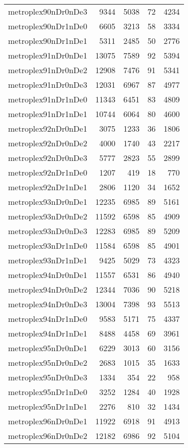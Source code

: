 \begin{longtable}{lrrrr}
metroplex90nDr0nDe3 & 9344 & 5038 & 72 & 4234 \\
metroplex90nDr1nDe0 & 6605 & 3213 & 58 & 3334 \\
metroplex90nDr1nDe1 & 5311 & 2485 & 50 & 2776 \\
metroplex91nDr0nDe1 & 13075 & 7589 & 92 & 5394 \\
metroplex91nDr0nDe2 & 12908 & 7476 & 91 & 5341 \\
metroplex91nDr0nDe3 & 12031 & 6967 & 87 & 4977 \\
metroplex91nDr1nDe0 & 11343 & 6451 & 83 & 4809 \\
metroplex91nDr1nDe1 & 10744 & 6064 & 80 & 4600 \\
metroplex92nDr0nDe1 & 3075 & 1233 & 36 & 1806 \\
metroplex92nDr0nDe2 & 4000 & 1740 & 43 & 2217 \\
metroplex92nDr0nDe3 & 5777 & 2823 & 55 & 2899 \\
metroplex92nDr1nDe0 & 1207 & 419 & 18 & 770 \\
metroplex92nDr1nDe1 & 2806 & 1120 & 34 & 1652 \\
metroplex93nDr0nDe1 & 12235 & 6985 & 89 & 5161 \\
metroplex93nDr0nDe2 & 11592 & 6598 & 85 & 4909 \\
metroplex93nDr0nDe3 & 12283 & 6985 & 89 & 5209 \\
metroplex93nDr1nDe0 & 11584 & 6598 & 85 & 4901 \\
metroplex93nDr1nDe1 & 9425 & 5029 & 73 & 4323 \\
metroplex94nDr0nDe1 & 11557 & 6531 & 86 & 4940 \\
metroplex94nDr0nDe2 & 12344 & 7036 & 90 & 5218 \\
metroplex94nDr0nDe3 & 13004 & 7398 & 93 & 5513 \\
metroplex94nDr1nDe0 & 9583 & 5171 & 75 & 4337 \\
metroplex94nDr1nDe1 & 8488 & 4458 & 69 & 3961 \\
metroplex95nDr0nDe1 & 6229 & 3013 & 60 & 3156 \\
metroplex95nDr0nDe2 & 2683 & 1015 & 35 & 1633 \\
metroplex95nDr0nDe3 & 1334 & 354 & 22 & 958 \\
metroplex95nDr1nDe0 & 3252 & 1284 & 40 & 1928 \\
metroplex95nDr1nDe1 & 2276 & 810 & 32 & 1434 \\
metroplex96nDr0nDe1 & 11922 & 6918 & 91 & 4913 \\
metroplex96nDr0nDe2 & 12182 & 6986 & 92 & 5104 \\

\end{longtable}
